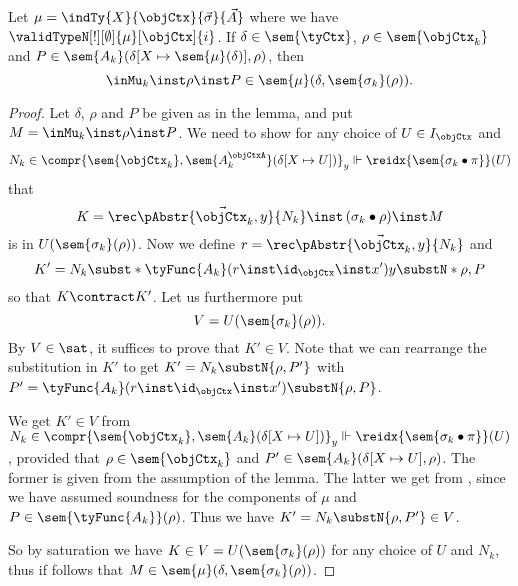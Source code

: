 \documentclass[preprint]{sigplanconf}
\begin{document}
\begin{lemma}
  \label{lem:constructor-closure}
  Let $\mu = \indTy{X}{\objCtx}{\vec{\sigma}}{\vec{A}}$ where we have
  $\validTypeN[!][\emptyset]{\mu}[\objCtx]{i}$.
  If $\delta \in \sem{\tyCtx}$, $\rho \in \sem{\objCtx_k}$ and
  $P \in \sem{A_k}(\delta[X \mapsto \sem{\mu}(\delta)], \rho)$, then
  \begin{equation*}
    \inMu_k \inst \rho \inst P \in \sem{\mu}(\delta, \sem{\sigma_k}(\rho)).
  \end{equation*}
\end{lemma}
\begin{proof}
  Let $\delta$, $\rho$ and $P$ be given as in the lemma, and
  put $M = \inMu_k \inst \rho \inst P$.
  We need to show for any choice of $U \in I_\objCtx$ and
  \begin{equation*}
    N_k \in \compr{\sem{\objCtx_k}, \sem{A_k^\objCtxA}(\delta[X \mapsto U])}_y
    \Vdash \reidx{\sem{\sigma_k \bullet \pi}}(U)
\end{equation*}
  that
  \begin{equation*}
    K = \rec \vec{\pAbstr{\objCtx_k, y}{N_k}}
    \inst \, (\sigma_k \bullet \rho) \inst M
  \end{equation*}
  is in $U(\sem{\sigma_k}(\rho))$.
  Now we define $r = \rec \vec{\pAbstr{\objCtx_k, y}{N_k}}$ and
  \begin{equation*}
    K' =
    N_k \subst*{\tyFunc{A_k}(r \inst \id_\objCtx \inst x')}{y} \substN*{\rho, P}
  \end{equation*}
  so that $K \contract K'$.
  Let us furthermore put
  \begin{equation*}
    V = U(\sem{\sigma_k}(\rho)).
  \end{equation*}
  By $V \in \sat$, it suffices to prove
  that $K' \in V$.
  Note that we can rearrange the substitution in $K'$ to get
  $K' = N_k \substN{\rho, P'}$ with
  $P' = \tyFunc{A_k}(r \inst \id_\objCtx \inst x') \substN{\rho, P}$.

  We get $K' \in V$ from
  $N_k \in \compr{\sem{\objCtx_k}, \sem{A_k}(\delta[X \mapsto U])}_y
  \Vdash \reidx{\sem{\sigma_k \bullet \pi}}(U)$,
  provided that $\rho \in \sem{\objCtx_k}$ and
  $P' \in \sem{A_k}(\delta[X \mapsto U], \rho)$.
  The former is given from the assumption of the lemma.
  The latter we get from ,
  since we have assumed soundness for the components of $\mu$ and
  $P \in \sem{\tyFunc{A_k}}(\rho)$.
  Thus we have $K' = N_k \substN{\rho, P'} \in V$.

  So by saturation we have $K \in V = U(\sem{\sigma_k}(\rho))$ for any choice
  of $U$ and $N_k$, thus if follows that
  $M \in \sem{\mu}(\delta, \sem{\sigma_k}(\rho))$.
\end{proof}
\end{document}
